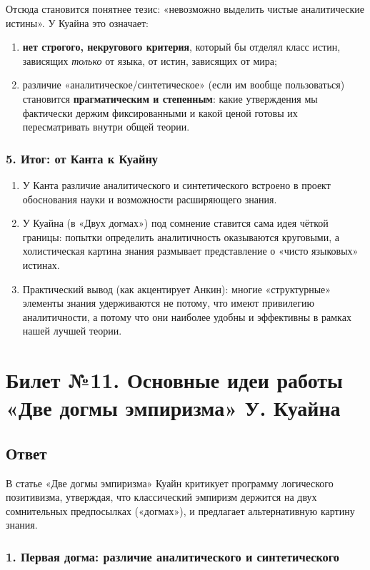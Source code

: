 \documentclass[a4paper,12pt]{article}
\begin{document}
Отсюда становится понятнее тезис: «невозможно выделить чистые аналитические истины». У Куайна это означает:
\begin{enumerate}
    \item \textbf{нет строгого, некругового критерия}, который бы отделял класс истин, зависящих \emph{только} от языка, от истин, зависящих от мира;
    \item различие «аналитическое/синтетическое» (если им вообще пользоваться) становится \textbf{прагматическим и степенным}: какие утверждения мы фактически держим фиксированными и какой ценой готовы их пересматривать внутри общей теории.
\end{enumerate}

\subsubsection*{5. Итог: от Канта к Куайну}

\begin{enumerate}
    \item У Канта различие аналитического и синтетического встроено в проект обоснования науки и возможности расширяющего знания.
    \item У Куайна (в «Двух догмах») под сомнение ставится сама идея чёткой границы: попытки определить аналитичность оказываются круговыми, а холистическая картина знания размывает представление о «чисто языковых» истинах.
    \item Практический вывод (как акцентирует Анкин): многие «структурные» элементы знания удерживаются не потому, что имеют привилегию аналитичности, а потому что они наиболее удобны и эффективны в рамках нашей лучшей теории.
\end{enumerate}


\newpage
\section{Билет №11. Основные идеи работы «Две догмы эмпиризма» У. Куайна}

\subsection{Ответ}

В статье «Две догмы эмпиризма» Куайн критикует программу логического позитивизма, утверждая, что классический эмпиризм держится на двух сомнительных предпосылках («догмах»), и предлагает альтернативную картину знания.

\subsubsection*{1. Первая догма: различие аналитического и синтетического}
\end{document}
